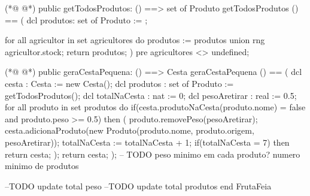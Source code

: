 \begin{vdmpp}[breaklines=true]
 
(*@
\label{getTodosProdutos:65}
@*)
 public getTodosProdutos: () ==> set of Produto
 getTodosProdutos () ==
 (
  dcl produtos: set of Produto := {};
  
  for all agricultor in set agricultores
   do
    produtos := produtos union rng agricultor.stock;
  return produtos;
 )
 pre agricultores <> undefined;
 
(*@
\label{geraCestaPequena:77}
@*)
 public geraCestaPequena: () ==> Cesta
 geraCestaPequena () ==
 (
  dcl cesta : Cesta := new Cesta();
  dcl produtos : set of Produto := getTodosProdutos();
  dcl totalNaCesta : nat := 0;
  dcl pesoAretirar : real := 0.5;
  for all produto in set produtos
   do 
    if(cesta.produtoNaCesta(produto.nome) = false and produto.peso >= 0.5)
     then 
      (
        produto.removePeso(pesoAretirar);
        cesta.adicionaProduto(new Produto(produto.nome, produto.origem, pesoAretirar));
        totalNaCesta := totalNaCesta + 1;
        if(totalNaCesta = 7)
         then return cesta;
      );
   return cesta;
 ); -- TODO peso minimo em cada produto? numero minimo de produtos

 --TODO update total peso
 --TODO update total produtos 
end FrutaFeia




\end{vdmpp}

